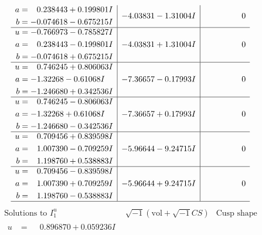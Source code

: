 \documentclass[1p]{elsarticle_modified}
\theoremstyle{definition}
\newcommand{\I}{\sqrt{-1}}
\begin{document}
$$\begin{array}{c|c|c}
\begin{aligned}
a &= \phantom{-}0.238443 + 0.199801 I \\
b &= -0.074618 - 0.675215 I\end{aligned}
 & -4.03831 - 1.31004 I & \phantom{-0.000000 } 0 \\ \hline\begin{aligned}
u &= -0.766973 - 0.785827 I \\
a &= \phantom{-}0.238443 - 0.199801 I \\
b &= -0.074618 + 0.675215 I\end{aligned}
 & -4.03831 + 1.31004 I & \phantom{-0.000000 } 0 \\ \hline\begin{aligned}
u &= \phantom{-}0.746245 + 0.806063 I \\
a &= -1.32268 - 0.61068 I \\
b &= -1.246680 + 0.342536 I\end{aligned}
 & -7.36657 - 0.17993 I & \phantom{-0.000000 } 0 \\ \hline\begin{aligned}
u &= \phantom{-}0.746245 - 0.806063 I \\
a &= -1.32268 + 0.61068 I \\
b &= -1.246680 - 0.342536 I\end{aligned}
 & -7.36657 + 0.17993 I & \phantom{-0.000000 } 0 \\ \hline\begin{aligned}
u &= \phantom{-}0.709456 + 0.839598 I \\
a &= \phantom{-}1.007390 - 0.709259 I \\
b &= \phantom{-}1.198760 + 0.538883 I\end{aligned}
 & -5.96644 - 9.24715 I & \phantom{-0.000000 } 0 \\ \hline\begin{aligned}
u &= \phantom{-}0.709456 - 0.839598 I \\
a &= \phantom{-}1.007390 + 0.709259 I \\
b &= \phantom{-}1.198760 - 0.538883 I\end{aligned}
 & -5.96644 + 9.24715 I & \phantom{-0.000000 } 0\\
 \hline 
 \end{array}$$\newpage$$\begin{array}{c|c|c}  
\text{Solutions to }I^u_{1}& \I (\text{vol} + \sqrt{-1}CS) & \text{Cusp shape}\\
 \hline 
\begin{aligned}
u &= \phantom{-}0.896870 + 0.059236 I \\

\end{aligned}
\end{array}$$
\end{document}
